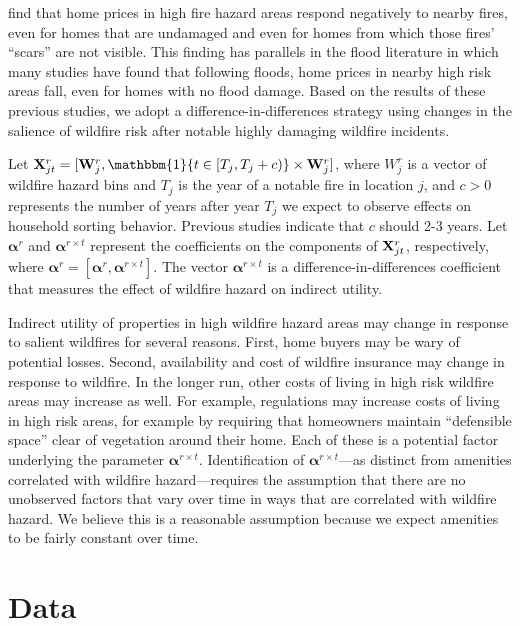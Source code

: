 \documentclass[10pt]{article}
\begin{document}
\citet{mccoywalsh} find that home prices in high fire hazard areas respond negatively to nearby fires, even for homes that are undamaged and even for homes from which those fires' ``scars'' are not visible. This finding has parallels in the flood literature in which many studies have found that following floods, home prices in nearby high risk areas fall, even for homes with no flood damage. Based on the results of these previous studies, we adopt a difference-in-differences strategy using changes in the salience of wildfire risk after notable highly damaging wildfire incidents. 

Let ${\bf X}^r_{jt} = [{\bf W}^r_{j}, \mathbbm{1}\{t \in [T_j,T_j + c)\} \times {\bf W}^r_j]$, where $W^r_j$ is a vector of wildfire hazard bins and $T_j$ is the year of a notable fire in location $j$, and $c > 0$ represents the number of years after year $T_j$ we expect to observe effects on household sorting behavior. Previous studies indicate that $c$ should 2-3 years. Let ${\boldsymbol \alpha}^r$ and ${\boldsymbol\alpha}^{r \times t}$ represent the coefficients on the components of ${\bf X}^r_{jt}$, respectively, where ${\boldsymbol \alpha}^r = [{\boldsymbol \alpha}^r, {\boldsymbol\alpha}^{r \times t}]$. The vector ${\boldsymbol\alpha}^{r \times t}$ is a difference-in-differences coefficient that measures the effect of wildfire hazard on indirect utility. 

Indirect utility of properties in high wildfire hazard areas may change in response to salient wildfires for several reasons. First, home buyers may be wary of potential losses. Second, availability and cost of wildfire insurance may change in response to wildfire. In the longer run, other costs of living in high risk wildfire areas may increase as well. For example, regulations may increase costs of living in high risk areas, for example by requiring that homeowners maintain ``defensible space'' clear of vegetation around their home. Each of these is a potential factor underlying the parameter ${\boldsymbol\alpha}^{r \times t}$. Identification of ${\boldsymbol\alpha}^{r \times t}$---as distinct from amenities correlated with wildfire hazard---requires the assumption that there are no unobserved factors that vary over time in ways that are correlated with wildfire hazard. We believe this is a reasonable assumption because we expect amenities to be fairly constant over time. 

\section{Data}
\end{document}
